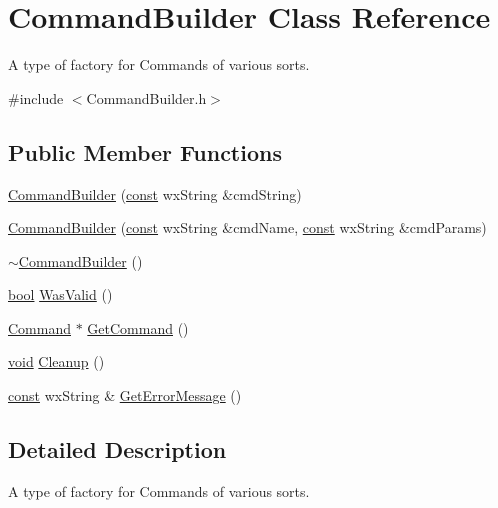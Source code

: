 \hypertarget{class_command_builder}{}\section{Command\+Builder Class Reference}
\label{class_command_builder}


A type of factory for Commands of various sorts.  




{\ttfamily \#include $<$Command\+Builder.\+h$>$}

\subsection*{Public Member Functions}
\begin{DoxyCompactItemize}
\item 
\hyperlink{class_command_builder_a47708947a5dbbd7d84c28d0ea82a2fef}{Command\+Builder} (\hyperlink{getopt1_8c_a2c212835823e3c54a8ab6d95c652660e}{const} wx\+String \&cmd\+String)
\item 
\hyperlink{class_command_builder_a32fb92d61ba90ac4e83086417c202c66}{Command\+Builder} (\hyperlink{getopt1_8c_a2c212835823e3c54a8ab6d95c652660e}{const} wx\+String \&cmd\+Name, \hyperlink{getopt1_8c_a2c212835823e3c54a8ab6d95c652660e}{const} wx\+String \&cmd\+Params)
\item 
\hyperlink{class_command_builder_ac37121d81a0a38b670cb8fd916794ffb}{$\sim$\+Command\+Builder} ()
\item 
\hyperlink{mac_2config_2i386_2lib-src_2libsoxr_2soxr-config_8h_abb452686968e48b67397da5f97445f5b}{bool} \hyperlink{class_command_builder_addd40de51ec6a67ae9fadc3db5647dba}{Was\+Valid} ()
\item 
\hyperlink{class_command}{Command} $\ast$ \hyperlink{class_command_builder_a4db8e53879f321bb76cacf0e5b170d41}{Get\+Command} ()
\item 
\hyperlink{sound_8c_ae35f5844602719cf66324f4de2a658b3}{void} \hyperlink{class_command_builder_ab03288b8c8ef586c29f51f0749398959}{Cleanup} ()
\item 
\hyperlink{getopt1_8c_a2c212835823e3c54a8ab6d95c652660e}{const} wx\+String \& \hyperlink{class_command_builder_ab16ba050126b8207ba6523279ab03c85}{Get\+Error\+Message} ()
\end{DoxyCompactItemize}


\subsection{Detailed Description}
A type of factory for Commands of various sorts. 

